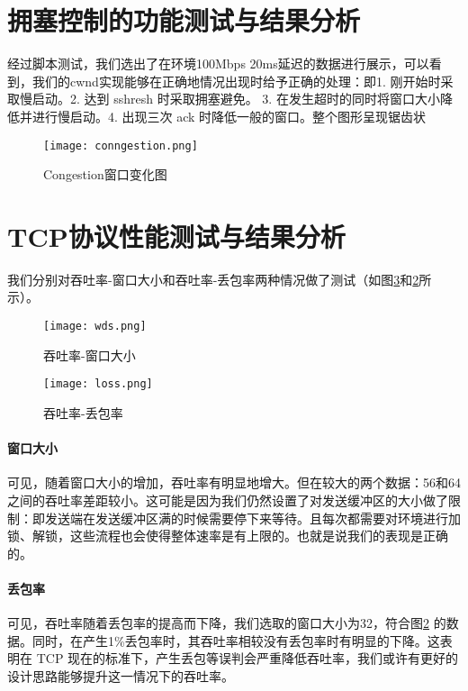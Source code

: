 \section{拥塞控制的功能测试与结果分析}
经过脚本测试，我们选出了在环境100Mbps 20ms延迟的数据进行展示，可以看到，我们的cwnd实现能够在正确地情况出现时给予正确的处理：即1. 刚开始时采取慢启动。2. 达到 sshresh 时采取拥塞避免。 3. 在发生超时的同时将窗口大小降低并进行慢启动。4. 出现三次 ack 时降低一般的窗口。整个图形呈现锯齿状

\begin{figure}[!htbp]
    \centering
    \texttt{[image: conngestion.png]}
    \caption{Congestion窗口变化图}\label{fig:congestion}
\end{figure}

\section{TCP协议性能测试与结果分析}

我们分别对吞吐率-窗口大小和吞吐率-丢包率两种情况做了测试（如图\ref{fig:throughtput-loss}和\ref{fig:throughtput-wds}所示）。

\begin{figure}[!htbp]
    \centering
    \texttt{[image: wds.png]}
    \caption{吞吐率-窗口大小}\label{fig:throughtput-wds}
\end{figure}


\begin{figure}[!htbp]
    \centering
    \texttt{[image: loss.png]}
    \caption{吞吐率-丢包率}\label{fig:throughtput-loss}
\end{figure}

\paragraph*{窗口大小} 可见，随着窗口大小的增加，吞吐率有明显地增大。但在较大的两个数据：56和64之间的吞吐率差距较小。这可能是因为我们仍然设置了对发送缓冲区的大小做了限制：即发送端在发送缓冲区满的时候需要停下来等待。且每次都需要对环境进行加锁、解锁，这些流程也会使得整体速率是有上限的。也就是说我们的表现是正确的。

\paragraph*{丢包率} 可见，吞吐率随着丢包率的提高而下降，我们选取的窗口大小为32，符合图\ref{fig:throughtput-wds} 的数据。同时，在产生1\%丢包率时，其吞吐率相较没有丢包率时有明显的下降。这表明在 TCP 现在的标准下，产生丢包等误判会严重降低吞吐率，我们或许有更好的设计思路能够提升这一情况下的吞吐率。





